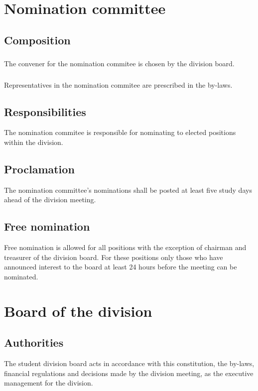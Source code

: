 \documentclass[a4paper]{dtek}
\begin{document}
\section{Nomination committee}
\subsection{Composition}
\subsubsection{}
The convener for the nomination commitee is chosen by the division board. 

\subsubsection{}
Representatives in the nomination commitee are prescribed in the by-laws. 

\subsection{Responsibilities}
The nomination commitee is responsible for nominating to elected positions within the division. 

\subsection{Proclamation}
The nomination committee's nominations shall be posted at least five study days ahead of the division meeting. 

\subsection{Free nomination}
Free nomination is allowed for all positions with the exception of chairman and treasurer of the division board. For these positions only those who have announced interest to the board at least 24 hours before the meeting can be nominated. 

\newpage

\section{Board of the division}
\subsection{Authorities}
The student division board acts in accordance with this constitution, the by-laws, financial regulations and decisions made by the division meeting, as the executive management for the division. 
\end{document}
